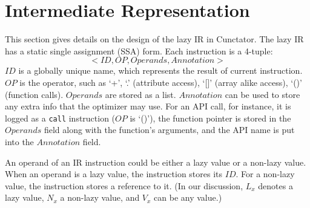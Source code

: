 \documentclass[sigconf]{acmart}\settopmatter{printfolios=true,printccs=false,printacmref=false}\setcopyright{none}
\begin{document}
\section{Intermediate Representation}
\label{sec:ir}

This section gives details on the design of the lazy IR in Cunctator.  
The lazy IR has a static single assignment (SSA) form. Each instruction is a 4-tuple: 
\[
<ID, OP, Operands, Annotation>
\]
$ID$ is a globally unique name, which represents the result of current instruction. $OP$ is the operator, such as `+', `.' (attribute access), `[]' (array alike access), `()' (function calls). $Operands$ are stored as a list. $Annotation$ can be used to store any extra info that the optimizer may use. For an API call, for instance, it is logged as a \texttt{call} instruction ($OP$ is `()'), the function pointer is stored in the $Operands$ field along with the function's arguments, and the API name is put into the $Annotation$ field.

An operand of an IR instruction could be either a lazy value or a non-lazy value. When an operand is a lazy value, the instruction stores its $ID$. For a non-lazy value, the instruction stores a reference to it. (In our discussion, $L_x$ denotes a lazy value, $N_x$ a non-lazy value, and $V_x$ can be any value.)



\end{document}
